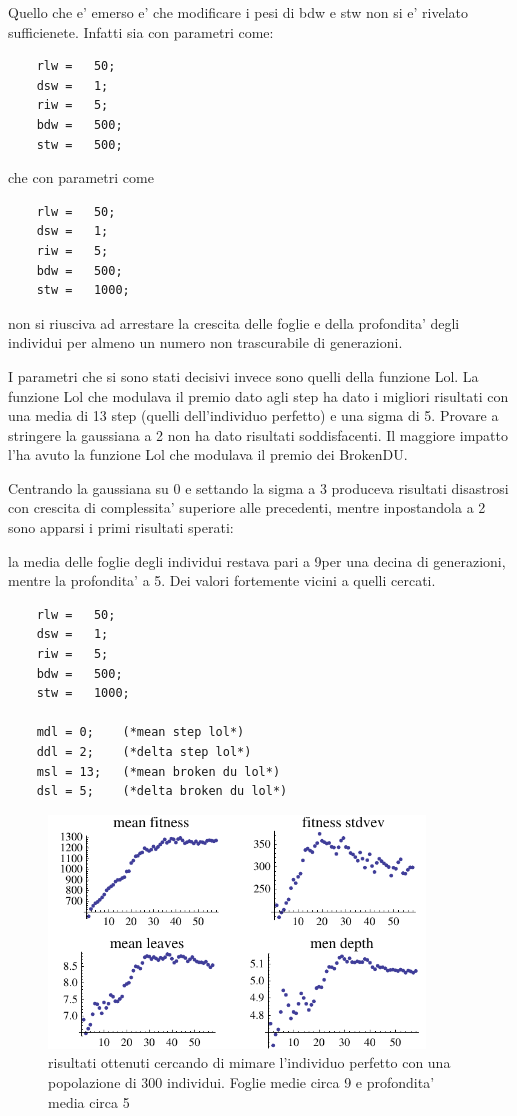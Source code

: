 \documentclass[12pt, a4paper]{article}
\begin{document}
Quello che e' emerso e' che modificare i pesi di bdw e stw non si e' rivelato sufficienete. Infatti sia con parametri come:
\begin{lstlisting}
	rlw	=	50;
	dsw	=	1;
	riw	=	5;
	bdw	=	500;
	stw	=	500;
\end{lstlisting}

che con parametri come
\begin{lstlisting}
	rlw	=	50;
	dsw	=	1;
	riw	=	5;
	bdw	=	500;
	stw	=	1000;
\end{lstlisting}

non si riusciva ad arrestare la crescita delle foglie e della profondita' degli individui per almeno un numero non trascurabile di generazioni.

I parametri che si sono stati decisivi invece sono quelli della funzione Lol.
La funzione Lol che modulava il premio dato agli step ha dato i migliori risultati con una media di 13 step (quelli dell'individuo perfetto) e una sigma di 5.
Provare a stringere la gaussiana a 2 non ha dato risultati soddisfacenti.
Il maggiore impatto l'ha avuto la funzione Lol che modulava il premio dei BrokenDU.

Centrando la gaussiana su 0 e settando la sigma a 3 produceva risultati disastrosi con crescita di complessita' superiore alle precedenti, mentre inpostandola a 2 sono apparsi i primi risultati sperati:

la media delle foglie degli individui restava pari a 9per una decina di generazioni, mentre la profondita' a 5. Dei valori fortemente vicini a quelli cercati.

\lstset{caption=parametri usati per mimare le caratteristiche dell'individuo perfetto,label=source:mim}
\begin{lstlisting}
	rlw	=	50;
	dsw	=	1;
	riw	=	5;
	bdw	=	500;
	stw	=	1000;

	mdl = 0;	(*mean step lol*) 
	ddl = 2;	(*delta step lol*) 
	msl = 13;	(*mean broken du lol*) 
	dsl = 5;	(*delta broken du lol*) 
\end{lstlisting}
\lstset{caption=,label=}

\begin{figure}[!h]
\begin{center}
\includegraphics[width=10.0cm]{expr5_run4.pdf}
\caption{risultati ottenuti cercando di mimare l'individuo perfetto con una popolazione di 300 individui. Foglie medie circa 9 e profondita' media circa 5} 
\label{figure:expr5run4}
\end{center}
\end{figure}
\end{document}
